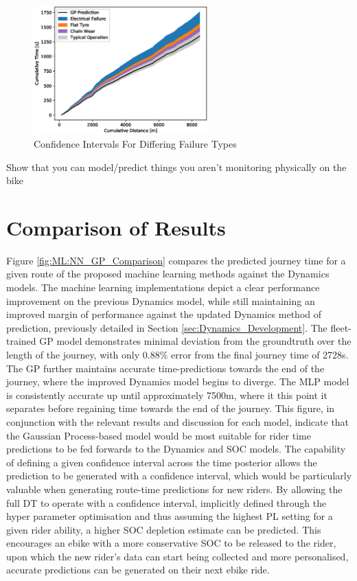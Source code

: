 \documentclass[a4paper, 10pt]{article}
\numberwithin{equation}{section}
\begin{document}
\begin{figure}[h!]
    \centering
    \includegraphics[width = 0.6\textwidth]{images/GP_Fault/future_confidence_interval.eps}
    \caption{Confidence Intervals For Differing Failure Types}
    \label{fig:GP_predicting_failure}
\end{figure}






Show that you can model/predict things you aren't monitoring physically on the bike


\section{Comparison of Results}
Figure \ref{fig:ML:NN_GP_Comparison} compares the predicted journey time for a given route of the proposed machine learning methods against the Dynamics models. The machine learning implementations depict a clear performance improvement on the previous Dynamics model, while still maintaining an improved margin of performance against the updated Dynamics method of prediction, previously detailed in Section \ref{sec:Dynamics_Development}. The fleet-trained GP model demonstrates minimal deviation from the groundtruth over the length of the journey, with only 0.88\% error from the final journey time of 2728s. The GP further maintains accurate time-predictions towards the end of the journey, where the improved Dynamics model begins to diverge. The MLP model is consistently accurate up until approximately 7500m, where it this point it separates before regaining time towards the end of the journey. This figure, in conjunction with the relevant results and discussion for each model, indicate that the Gaussian Process-based model would be most suitable for rider time predictions to be fed forwards to the Dynamics and SOC models. The capability of defining a given confidence interval across the time posterior allows the prediction to be generated with a confidence interval, which would be particularly valuable when generating route-time predictions for new riders. By allowing the full DT to operate with a confidence interval, implicitly defined through the hyper parameter optimisation and thus assuming the highest PL setting for a given rider ability, a higher SOC depletion estimate can be predicted. This encourages an ebike with a more conservative SOC to be released to the rider, upon which the new rider's data can start being collected and more personalised, accurate predictions can be generated on their next ebike ride. \medbreak
\end{document}
